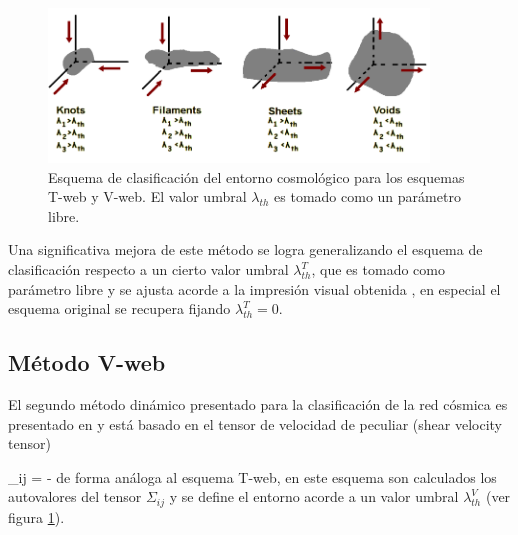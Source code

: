 \begin{figure}[htbp]
	\centering
	\includegraphics[width=0.9\textwidth]
	{./figures/2_theoretical_framework/EnvironmentClassification.png}

	\caption{\small{Esquema de clasificación del entorno cosmológico 
	para los esquemas T-web y V-web. El valor umbral $\lambda_{th}$ es 
	tomado como un parámetro libre.}}
	
	\label{fig:ClassificationSchemeTweb}
\end{figure}


Una significativa mejora de este método se logra generalizando el esquema 
de clasificación respecto a un cierto valor umbral $\lambda_{th}^T$, que 
es tomado como parámetro libre y se ajusta acorde a la impresión visual 
obtenida \cite{forero2008}, en especial el esquema original se recupera 
fijando $\lambda_{th}^T=0$.


	\subsection{Método V-web}
	\label{subsec:TheV-webMethod}


El segundo método dinámico presentado para la clasificación de la red 
cósmica es presentado en \cite{hoffman2012} y está basado en el tensor de 
velocidad de peculiar (shear velocity tensor)


{ \Sigma_{ij} = - }
de forma análoga al esquema T-web, en este esquema son calculados los 
auto\-valores del tensor $\Sigma_{ij}$ y se define el entorno acorde a un 
valor umbral $\lambda_{th}^V$ (ver figura \ref{fig:ClassificationSchemeTweb}).


